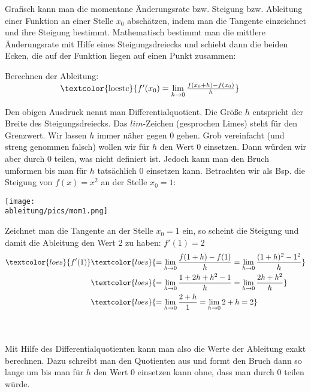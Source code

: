 Grafisch kann man die momentane Änderungsrate bzw. Steigung bzw. Ableitung einer Funktion an einer Stelle \(x_0\) abschätzen, indem man die Tangente einzeichnet und ihre Steigung bestimmt. Mathematisch bestimmt man die mittlere Änderungsrate mit Hilfe eines Steigungsdreiecks und schiebt dann die beiden Ecken, die auf der Funktion liegen auf einen Punkt zusammen:
\begin{tcolorbox}
	Berechnen der Ableitung:\\
	$\makebox[\linewidth]{\textcolor{loestc}{\(f'(x_0)=\lim\limits_{h\to 0}\frac{f(x_0+h)-f(x_0)}{h}\)}}$
\end{tcolorbox}
Den obigen Ausdruck nennt man Differentialquotient. Die Größe \(h\) entspricht der Breite des Steigungsdreiecks. Das \(lim\)-Zeichen (gesprochen Limes) steht für den Grenzwert. Wir lassen \(h\) immer näher gegen \(0\) gehen. Grob vereinfacht (und streng genommen falsch) wollen wir für \(h\) den Wert \(0\) einsetzen. Dann würden wir aber durch \(0\) teilen, was nicht definiert ist. Jedoch kann man den Bruch umformen bis man für \(h\) tatsächlich \(0\) einsetzen kann. Betrachten wir als Bsp. die Steigung von \(f(x)=x^2\) an der Stelle \(x_0=1\):\\
\begin{minipage}[t]{\textwidth}
	\begin{minipage}{0.4\textwidth}
		\centering\texttt{[image: \\ableitung/pics/mom1.png]}
	\end{minipage}
	\begin{minipage}{0.6\textwidth}
		\textcolor{loes}{Zeichnet man die Tangente an der Stelle \(x_0=1\) ein, so scheint die Steigung und damit die Ableitung den Wert 2 zu haben: \(f'(1)=2\)}\\
		\begin{align*}
			\textcolor{loes}{f'(1)}&\textcolor{loes}{=\lim\limits_{h\to 0}\frac{f(1+h)-f(1)}{h}=\lim\limits_{h\to 0}\frac{(1+h)^2-1^2}{h}}\\
			&\textcolor{loes}{=\lim\limits_{h\to 0}\frac{1+2h+h^2-1}{h}=\lim\limits_{h\to 0}\frac{2h+h^2}{h}}\\
			&\textcolor{loes}{=\lim\limits_{h\to 0}\frac{2+h}{1}=\lim\limits_{h\to 0}2+h=2}
		\end{align*}
	\end{minipage}
\end{minipage}\\
\phantom{text}\\Mit Hilfe des Differentialquotienten kann man also die Werte der Ableitung exakt berechnen. Dazu schreibt man den Quotienten aus und formt den Bruch dann so lange um bis man für \(h\) den Wert \(0\) einsetzen kann ohne, dass man durch \(0\) teilen würde.\\
